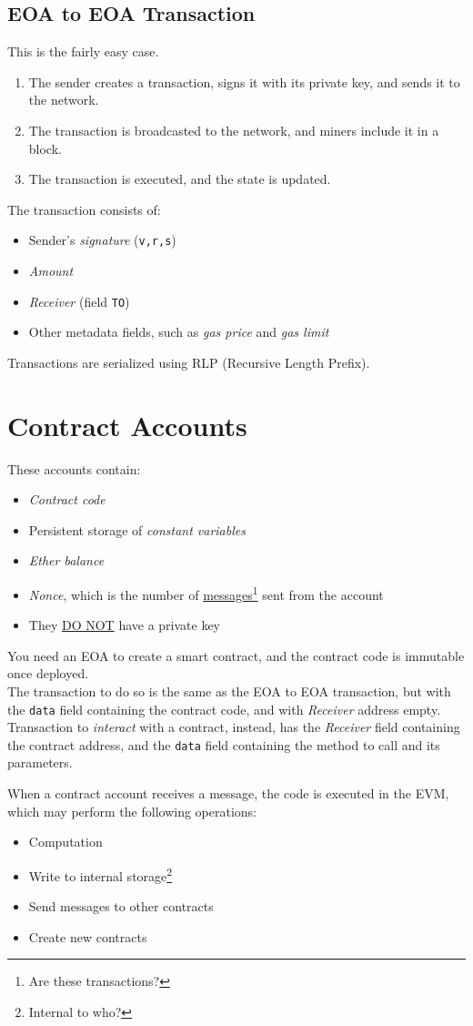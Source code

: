\subsection{EOA to EOA Transaction}
{This is the fairly easy case.\ns
\begin{enumerate}
   \item The sender creates a transaction, signs it with its private key, and sends it to the network.
   \item The transaction is broadcasted to the network, and miners include it in a block.
   \item The transaction is executed, and the state is updated.
\end{enumerate}}
{The transaction consists of:\ns
\begin{itemize}
   \item Sender's \textit{signature} (\texttt{v,r,s})
   \item \textit{Amount}
   \item \textit{Receiver} (field \texttt{TO})
   \item Other metadata fields, such as \textit{gas price} and \textit{gas limit}
\end{itemize}}
Transactions are serialized using RLP (Recursive Length Prefix).

\section{Contract Accounts}
{These accounts contain:\ns
\begin{itemize}
   \item \textit{Contract code}
   \item Persistent storage of \textit{constant variables}
   \item \textit{Ether balance}
   \item \textit{Nonce}, which is the number of \ul{messages}\footnote{Are these transactions?} sent from the account
   \item They \ul{DO NOT} have a private key
\end{itemize}}

You need an EOA to create a smart contract, and the contract code is immutable once deployed.\\
The transaction to do so is the same as the EOA to EOA transaction, but with the \texttt{data} field containing the contract code, and with \textit{Receiver} address empty.\\
Transaction to \textit{interact} with a contract, instead, has the \textit{Receiver} field containing the contract address, and the \texttt{data} field containing the method to call and its parameters.

{When a contract account receives a message, the code is executed in the EVM, which may perform the following operations:\ns
\begin{itemize}
   \item Computation
   \item Write to internal storage\footnote{Internal to who?}
   \item Send messages to other contracts
   \item Create new contracts
\end{itemize}}

